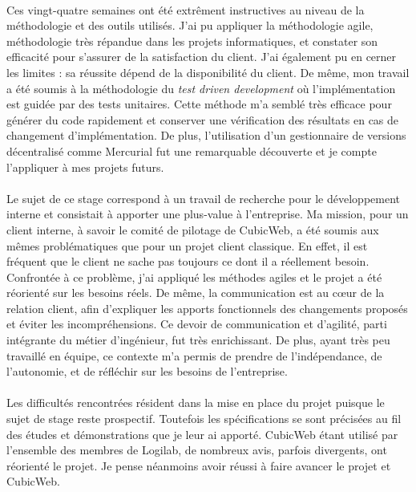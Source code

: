 \documentclass {report}
\begin{document}
\paragraph{}
Ces vingt-quatre semaines ont été extrêment instructives au niveau de la méthodologie et des outils utilisés. J'ai pu appliquer la méthodologie agile, méthodologie très répandue dans les projets informatiques, et constater son efficacité pour s'assurer de la satisfaction du client. J'ai également pu en cerner les limites : sa réussite dépend de la disponibilité du client. De même, mon travail a été soumis à la méthodologie du \textit{test driven development} où l'implémentation est guidée par des tests unitaires. Cette méthode m'a semblé très efficace pour générer du code rapidement et conserver une vérification des résultats en cas de changement d'implémentation. De plus, l'utilisation d'un gestionnaire de versions décentralisé comme Mercurial fut une remarquable découverte et je compte l'appliquer à mes projets futurs.

\paragraph{}
Le sujet de ce stage correspond à un travail de recherche pour le développement interne et consistait à apporter une plus-value à l'entreprise. Ma mission, pour un client interne, à savoir le comité de pilotage de CubicWeb, a été soumis aux mêmes problématiques que pour un projet client classique. En effet, il est fréquent que le client ne sache pas toujours ce dont il a réellement besoin. Confrontée à ce problème, j'ai appliqué les méthodes agiles et le projet a été réorienté sur les besoins réels. De même, la communication est au cœur de la relation client, afin d'expliquer les apports fonctionnels des changements proposés et éviter les incompréhensions. Ce devoir de communication et d'agilité, parti intégrante du métier d'ingénieur, fut très enrichissant. De plus, ayant très peu travaillé en équipe, ce contexte m'a permis de prendre de l'indépendance, de l'autonomie, et de réfléchir sur les besoins de l'entreprise.

\paragraph{}
Les difficultés rencontrées résident dans la mise en place du projet puisque le sujet de stage reste prospectif. Toutefois les spécifications se sont précisées au fil des études et démonstrations que je leur ai apporté. CubicWeb étant utilisé par l'ensemble des membres de Logilab, de nombreux avis, parfois divergents, ont réorienté le projet. Je pense néanmoins avoir réussi à faire avancer le projet et CubicWeb.
\end{document}

